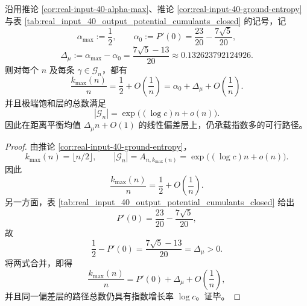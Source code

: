 \begin{theorem}[最大密度层与平衡均值之间存在显式代数间隙而仍保留正熵]\label{thm:xi-real-input-ground-layer-mean-gap-positive-entropy}
沿用推论 \ref{cor:real-input-40-alpha-max}、推论 \ref{cor:real-input-40-ground-entropy} 与表 \ref{tab:real_input_40_output_potential_cumulants_closed} 的记号，记
\[
\alpha_{\max}:=\frac12,
\qquad
\alpha_0:=P'(0)=\frac{23}{20}-\frac{7\sqrt5}{20},
\]
\[
\Delta_\mu:=\alpha_{\max}-\alpha_0
=
\frac{7\sqrt5-13}{20}
\approx 0.132623792124926.
\]
则对每个 \(n\) 及每条 \(\gamma\in\mathcal G_n\)，都有
\[
\frac{k_{\max}(n)}{n}
=
\frac12+O\!\left(\frac{1}{n}\right)
=
\alpha_0+\Delta_\mu+O\!\left(\frac{1}{n}\right).
\]
并且极端饱和层的总数满足
\[
|\mathcal G_n|
=
\exp\bigl((\log c)n+o(n)\bigr).
\]
因此在距离平衡均值 \(\Delta_\mu n+O(1)\) 的线性偏差层上，仍承载指数多的可行路径。
\end{theorem}
\begin{proof}
由推论 \ref{cor:real-input-40-ground-entropy}，
\[
k_{\max}(n)=\lfloor n/2\rfloor,
\qquad
|\mathcal G_n|=A_{n,k_{\max}(n)}
=
\exp\bigl((\log c)n+o(n)\bigr).
\]
因此
\[
\frac{k_{\max}(n)}{n}=\frac12+O\!\left(\frac{1}{n}\right).
\]
另一方面，表 \ref{tab:real_input_40_output_potential_cumulants_closed} 给出
\[
P'(0)=\frac{23}{20}-\frac{7\sqrt5}{20},
\]
故
\[
\frac12-P'(0)=\frac{7\sqrt5-13}{20}=\Delta_\mu>0.
\]
将两式合并，即得
\[
\frac{k_{\max}(n)}{n}
=
P'(0)+\Delta_\mu+O\!\left(\frac{1}{n}\right),
\]
并且同一偏差层的路径总数仍具有指数增长率 \(\log c\)。证毕。
\end{proof}


